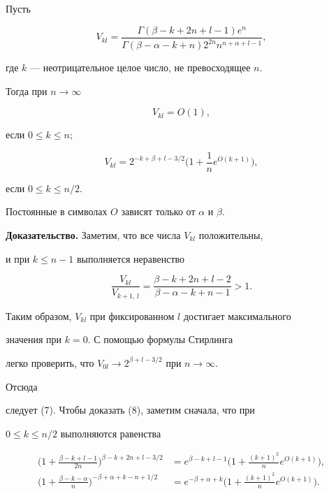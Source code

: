 \begin{lem} 


Пусть 


$$ 


V_{kl}=\frac{\Gamma(\beta-k+2n+l-1)e^n} 


{\Gamma(\beta-\alpha-k+n)2^{2n}n^{n+\alpha+l-1}}, 


$$ 


где $k$ --- неотрицательное целое число, не превосходящее $n$. 


Тогда при $n\to\infty$ 


\begin{equation} 


V_{kl}=O(1), 


\end{equation} 


если $0\le k\le n;$ 


\begin{equation} 


V_{kl}=2^{-k+\beta+l-3/2}\bigg(1+\frac{1}{n} 


e^{O(k+1)}\bigg), 


\end{equation} 


если $0\le k\le n/2$. 


Постоянные в символах $O$ зависят только от $\alpha$ и $\beta$. 


\end{lem} 


 


{\bf Доказательство.} Заметим, что все числа $V_{kl}$ положительны, 


и при $k\le n-1$ выполняется неравенство 


$$ 


\frac{V_{kl}}{V_{k+1,\,l}}= 


\frac{\beta-k+2n+l-2}{\beta-\alpha-k+n-1}>1. 


$$ 


Таким образом, $V_{kl}$ при фиксированном $l$ достигает максимального 


значения при $k=0$. С помощью формулы Стирлинга 


легко проверить, что $V_{0l}\to 2^{\beta+l-3/2}$ при $n\to\infty$. 


Отсюда 


следует (7). Чтобы доказать (8), заметим сначала, что при 


$0\le k\le n/2$ выполняются равенства 


\begin{align*} 


\bigg(1+\frac{\beta-k+l-1}{2n} 


\bigg)^{\beta-k+2n+l-3/2}&=e^{\beta-k+l-1} 


\bigg(1+\frac{(k+1)^2}{n}e^{O(k+1)} \bigg),\\ 


% 


\bigg(1+\frac{\beta-k-\alpha}{n} 


\bigg)^{-\beta+\alpha+k-n+1/2}&=e^{-\beta+\alpha+k} 


\bigg(1+\frac{(k+1)^2}{n}e^{O(k+1)} \bigg). 


\end{align*} 


